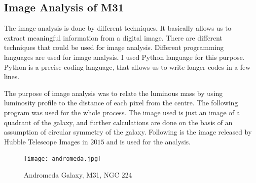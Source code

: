 \subsection{Image Analysis of M31}
The image analysis is done by different techniques. It basically allows us to extract meaningful information from a digital image. There are different techniques that could be used for image analysis. Different programming languages are used for image analysis. I used Python language for this purpose. Python is a precise coding language, that allows us to write longer codes in a few lines.

The purpose of image analysis was to relate the luminous mass by using luminosity profile to the distance of each pixel from the centre. The following program was used for the whole process. The image used is just an image of a quadrant of the galaxy, and further calculations are done on the basis of an assumption of circular symmetry of the galaxy. Following is the image released by Hubble Telescope Images in $2015$ and is used for the analysis.
\begin{figure}[h!]
\centering
\texttt{[image: andromeda.jpg]}
\caption{Andromeda Galaxy, M31, NGC 224}
\end{figure}

